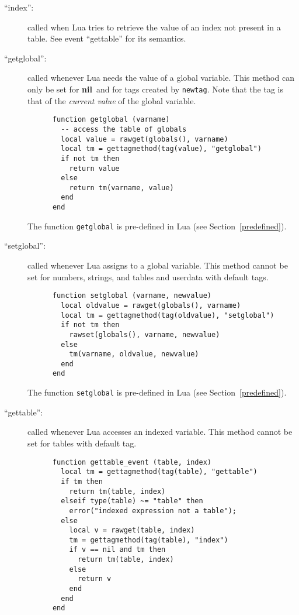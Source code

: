 \documentclass[11pt]{article}
\newcommand{\See}[1]{Section~\ref{#1}}
\newcommand{\see}[1]{(see \See{#1})}
\newcommand{\nil}{{\bf nil}}
\begin{document}
\begin{description}
\item[``index'':]
called when Lua tries to retrieve the value of an index
not present in a table.
See event ``gettable'' for its semantics.

\item[``getglobal'':]
called whenever Lua needs the value of a global variable.
This method can only be set for \nil\ and for tags
created by \verb|newtag|.
Note that
the tag is that of the \emph{current value} of the global variable.
\begin{verbatim}
      function getglobal (varname)
        -- access the table of globals
        local value = rawget(globals(), varname)
        local tm = gettagmethod(tag(value), "getglobal")
        if not tm then
          return value
        else
          return tm(varname, value)
        end
      end
\end{verbatim}
The function \verb|getglobal| is pre-defined in Lua \see{predefined}.

\item[``setglobal'':]
called whenever Lua assigns to a global variable.
This method cannot be set for numbers, strings, and tables and
userdata with default tags.
\begin{verbatim}
      function setglobal (varname, newvalue)
        local oldvalue = rawget(globals(), varname)
        local tm = gettagmethod(tag(oldvalue), "setglobal")
        if not tm then
          rawset(globals(), varname, newvalue)
        else
          tm(varname, oldvalue, newvalue)
        end
      end
\end{verbatim}
The function \verb|setglobal| is pre-defined in Lua \see{predefined}.

\item[``gettable'':]
called whenever Lua accesses an indexed variable.
This method cannot be set for tables with default tag.
\begin{verbatim}
      function gettable_event (table, index)
        local tm = gettagmethod(tag(table), "gettable")
        if tm then
          return tm(table, index)
        elseif type(table) ~= "table" then
          error("indexed expression not a table");
        else
          local v = rawget(table, index)
          tm = gettagmethod(tag(table), "index")
          if v == nil and tm then
            return tm(table, index)
          else
            return v
          end
        end
      end
\end{verbatim}


\end{description}
\end{document}

